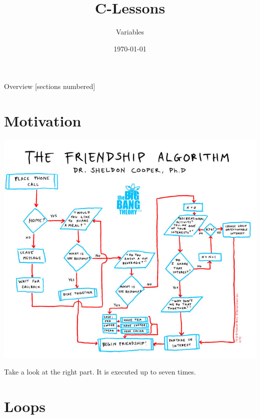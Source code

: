 


\title{C-Lessons}
\subtitle{Variables}
\date{\today}



\begin{frame}
	\titlepage
\end{frame}
\begin{frame}{Overview}
	[sections numbered]
	\tableofcontents
\end{frame}

\section{Motivation}

\begin{frame}
	\centerline{\includegraphics[scale=.32]{../img/friendship.jpg}}
	\bigskip
	Take a look at the right part. It is executed up to seven times.
\end{frame}
\section{Loops}

